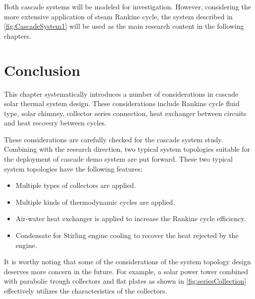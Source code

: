 Both cascade systems will be modeled for investigation. However, considering the more extensive application of steam Rankine cycle, the system described in \autoref{fig:CascadeSystem1} will be used as the main research content in the following chapters.

\section{Conclusion}
This chapter systematically introduces a number of considerations in cascade solar thermal system design. These considerations include Rankine cycle fluid type, solar chimney, collector series connection, heat exchanger between circuits and heat recovery between cycles. 

These considerations are carefully checked for the cascade system study. Combining with the research direction, two typical system topologies suitable for the deployment of cascade demo system are put forward. These two typical system topologies have the following features:

\begin{itemize}
  \item Multiple types of collectors are applied.
  \item Multiple kinds of thermodynamic cycles are applied. 
  \item Air-water heat exchanger is applied to increase the Rankine cycle efficiency.
  \item Condensate for Stirling engine cooling to recover the heat rejected by the engine.
\end{itemize}

It is worthy noting that some of the considerations of the system topology design deserves more concern in the future. For example, a solar power tower combined with parabolic trough collectors and flat plates as shown in \autoref{fig:seriesCollection} effectively utilizes the characteristics of the collectors.